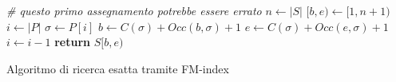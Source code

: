 \documentclass[a4paper,12pt, oneside]{book}
\begin{document}
\begin{algorithm}
  \begin{algorithmic}
    \State \textit{\# questo primo assegnamento potrebbe essere errato}
    \State $n\gets |S|$
    \State $[b,e)\gets [1, n+1)$
    \State $i\gets |P|$
    \While {$[b,e)\neq \emptyset\,\,\,\land\,\,\, i>0$}
    \State $\sigma\gets P[i]$
    \State $b\gets C(\sigma)+Occ(b,\sigma)+1$
    \State $e\gets C(\sigma)+Occ(e,\sigma)+1$
    \State $i\gets i-1$
    \EndWhile
    \If {$[b,e)\neq \emptyset$}
    \State \textbf{return} $S[b,e)$
    \EndIf
    \EndFunction
  \end{algorithmic}
  \caption{Algoritmo di ricerca esatta tramite FM-index}
\end{algorithm}
\end{document}

